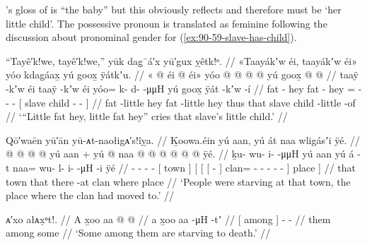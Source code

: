 \citeauthor{swanton:1909}’s gloss of  is “the baby” but this obviously reflects  and therefore must be ‘her little child’.
The possessive pronoun  is translated as feminine following the discussion about pronominal gender for (\ref{ex:90-59-slave-has-child}).

\ex\label{ex:90-66-little-fat}%
%
\begingl
	\glpreamble	“Tayê′k!we, tayê′k!we,” yūk dag̣¯á′x yū′gux ỵêtk!ᵒ. //
	\glpreamble	«\!Taayákʼw éi, taayákʼw éi\!» yóo kdag̱áax̱ yú goox̱ ÿátkʼu. //
	\gla	«\! @ {} éi  @ {} éi\!»
		yóo @  @ {} @ {} @ {}
		{} yú goox̱  @ {} @ {} {} //
	\glb	\pqp{}taaÿ -kʼw éi taaÿ -kʼw éi
		yóo= k- d-  -μμH
		{} yú goox̱ ÿát -kʼw -í {} //
	\glc	\pqp{}fat - hey fat - hey
		= - -  -
		{}[  slave child - - {}] //
	\gld	\pqp{}fat -little hey fat -little hey
		thus  {} {} {}
		{} that slave child -little -of {} //
	\glft	‘“Little fat hey, little fat hey” cries that slave’s little child.’
		//
\endgl
\xe

\ex\label{ex:90-67-little-fat}%
%
\begingl
	\glpreamble	Qō′waēn yū′ān yū-ᴀt-naołigᴀ′s!îỵa. //
	\glpreamble	Ḵoowa.éin yú aan, yú át naa wligásʼi ÿé. //
	\gla	{} @ {} @ {} @ {} @ {}
		{} yú aan {} +
		{} yú 
			{} {}  @ {} {}
				naa @  @ {} @ {} @ {} @ {} @ {} {}
			ÿé. {} //
	\glb	ḵu- wu- i-  -μμH
		{} yú aan {}
		{} yú
			{} {} á -t {}
				naa= wu- l- i-  -μH -i {}
			ÿé {} //
	\glc	{}- - -  -
		{}[  town {}]
		{}[ 
			{}[ {}[  - {}]
				clan= - - -  - - {}]
			place {}] //
	\gld	{} {} {} {} {}
		{} that town {}
		{} that
			{} {} there -at {}
				clan  {} {} {} {} \·where {}
			place {} //
	\glft	‘People were starving at that town, the place where the clan had moved to.’
		//
\endgl
\xe

\ex\label{ex:90-68-little-fat}%
%
\begingl
	\glpreamble	ᴀ′xo ałᴀx̣ᵘt!. //
	\gla	{} A x̱oo aa {}  @ {} @ {} //
	\glb	{} a x̱oo aa {}  -μH -tʼ //
	\glc	{}[  among  {}]  - - //
	\gld	{} them among some {}  {} {} //
	\glft	‘Some among them are starving to death.’
		//
\endgl
\xe

